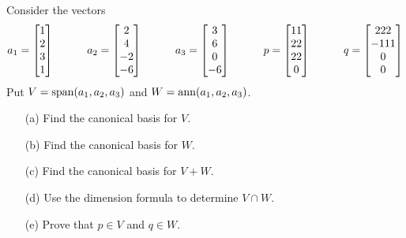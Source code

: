 \documentclass[a4paper]{article}
\begin{document}
\begin{problem}[Mock 2]
 Consider the vectors
 \[ a_1 = \left[\begin{matrix} 1\\2\\3\\1\end{matrix}\right] \hspace{3em}
    a_2 = \left[\begin{matrix} 2\\4\\-2\\-6 \end{matrix}\right] \hspace{3em}
    a_3 = \left[\begin{matrix} 3\\6\\0\\-6 \end{matrix}\right] \hspace{3em}
    p = \left[\begin{matrix} 11\\22\\22\\0\end{matrix}\right] \hspace{3em}
    q = \left[\begin{matrix} 222\\-111\\0\\0\end{matrix}\right]
 \]
 Put $V=\operatorname{span}(a_1,a_2,a_3)$ and $W=\operatorname{ann}(a_1,a_2,a_3)$.
 \begin{itemize}
  \item[(a)] Find the canonical basis for $V$. 
  \item[(b)] Find the canonical basis for $W$. 
  \item[(c)] Find the canonical basis for $V+W$. 
  \item[(d)] Use the dimension formula to determine $V\cap W$. 
  \item[(e)] Prove that $p\in V$ and $q\in W$. 
 \end{itemize}
\end{problem}
\end{document}
